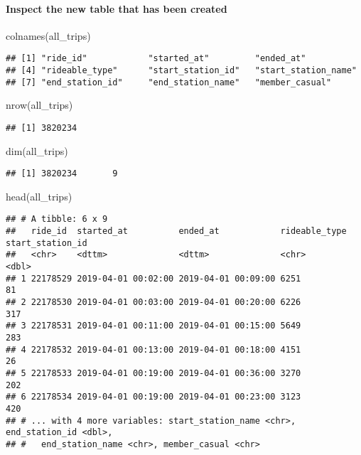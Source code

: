\documentclass[
]{article}
\newenvironment{Shaded}{\begin{snugshade}}{\end{snugshade}}
\newcommand{\FunctionTok}[1]{\textcolor[rgb]{0.00,0.00,0.00}{#1}}
\newcommand{\NormalTok}[1]{#1}
\begin{document}
\hypertarget{inspect-the-new-table-that-has-been-created}{%
\paragraph{Inspect the new table that has been
created}\label{inspect-the-new-table-that-has-been-created}}

\begin{Shaded}
\begin{Highlighting}[]
\FunctionTok{colnames}\NormalTok{(all\_trips)}
\end{Highlighting}
\end{Shaded}

\begin{verbatim}
## [1] "ride_id"            "started_at"         "ended_at"          
## [4] "rideable_type"      "start_station_id"   "start_station_name"
## [7] "end_station_id"     "end_station_name"   "member_casual"
\end{verbatim}

\begin{Shaded}
\begin{Highlighting}[]
\FunctionTok{nrow}\NormalTok{(all\_trips)}
\end{Highlighting}
\end{Shaded}

\begin{verbatim}
## [1] 3820234
\end{verbatim}

\begin{Shaded}
\begin{Highlighting}[]
\FunctionTok{dim}\NormalTok{(all\_trips)}
\end{Highlighting}
\end{Shaded}

\begin{verbatim}
## [1] 3820234       9
\end{verbatim}

\begin{Shaded}
\begin{Highlighting}[]
\FunctionTok{head}\NormalTok{(all\_trips)}
\end{Highlighting}
\end{Shaded}

\begin{verbatim}
## # A tibble: 6 x 9
##   ride_id  started_at          ended_at            rideable_type start_station_id
##   <chr>    <dttm>              <dttm>              <chr>                    <dbl>
## 1 22178529 2019-04-01 00:02:00 2019-04-01 00:09:00 6251                        81
## 2 22178530 2019-04-01 00:03:00 2019-04-01 00:20:00 6226                       317
## 3 22178531 2019-04-01 00:11:00 2019-04-01 00:15:00 5649                       283
## 4 22178532 2019-04-01 00:13:00 2019-04-01 00:18:00 4151                        26
## 5 22178533 2019-04-01 00:19:00 2019-04-01 00:36:00 3270                       202
## 6 22178534 2019-04-01 00:19:00 2019-04-01 00:23:00 3123                       420
## # ... with 4 more variables: start_station_name <chr>, end_station_id <dbl>,
## #   end_station_name <chr>, member_casual <chr>
\end{verbatim}
\end{document}
